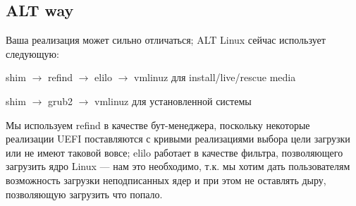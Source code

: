 \documentclass[10pt, a5paper]{article}
\begin{document}
\newpage
\subsection*{ALT way}

Ваша  реализация может сильно отличаться; ALT Linux сейчас использует следующую:

shim $\rightarrow$ refind $\rightarrow$ elilo $\rightarrow$ vmlinuz для install/live/rescue media 

shim $\rightarrow$ grub2 $\rightarrow$ vmlinuz для установленной системы

Мы используем refind в качестве бут-менеджера, поскольку некоторые реализации UEFI поставляются с кривыми реализациями выбора цели загрузки или не имеют таковой вовсе; elilo работает в качестве фильтра, позволяющего загрузить ядро Linux --- нам это необходимо, т.к. мы хотим дать пользователям возможность загрузки неподписанных ядер и при этом не оставлять дыру, позволяющую загрузить что попало.
\end{document}
